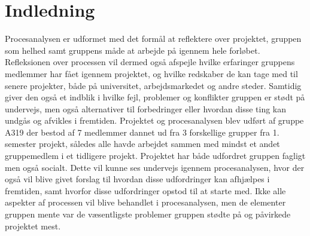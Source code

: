 \chapter{Indledning}\label{Indledning}

Procesanalysen er udformet med det formål at reflektere over projektet, gruppen som helhed samt gruppens måde at arbejde på igennem hele forløbet. Refleksionen over processen vil dermed også afspejle hvilke erfaringer gruppens medlemmer har fået igennem projektet, og hvilke redskaber de kan tage med til senere projekter, både på universitet, arbejdsmarkedet og andre steder. Samtidig giver den også et indblik i hvilke fejl, problemer og konflikter gruppen er stødt på undervejs, men også alternativer til forbedringer eller hvordan disse ting kan undgås og afvikles i fremtiden. Projektet og procesanalysen blev udført af gruppe A319 der bestod af 7 medlemmer dannet ud fra 3 forskellige grupper fra 1. semester projekt, således alle havde arbejdet sammen med mindst et andet gruppemedlem i et tidligere projekt. Projektet har både udfordret gruppen fagligt men også socialt. Dette vil kunne ses undervejs igennem procesanalysen, hvor der også vil blive givet forslag til hvordan disse udfordringer kan afhjælpes i fremtiden, samt hvorfor disse udfordringer opstod til at starte med. Ikke alle aspekter af processen vil blive behandlet i procesanalysen, men de elementer gruppen mente var de væsentligste problemer gruppen stødte på og påvirkede projektet mest.
